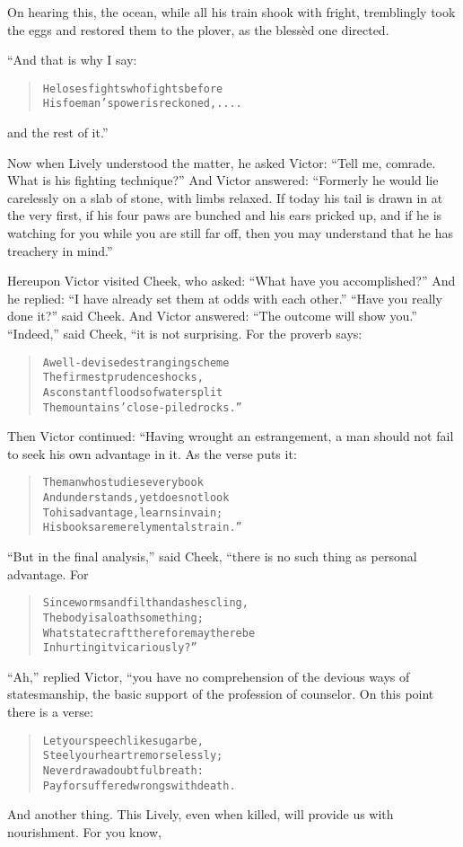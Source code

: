 \documentclass[article, twoside, 10pt]{memoir}
\renewenvironment{verbatim}{%
\begin{quote}%
\vskip -10pt%
\begin{alltt}\normalfont\small}{\end{alltt}%
\end{quote}%
\vskip -10pt
} %
\begin{document}
On hearing this, the ocean, while all his train shook with fright,
tremblingly took the eggs and restored them to the plover, as the
blessèd one directed.

“And that is why I say:

\begin{verbatim}
He loses fights who fights before
    His foeman's power is reckoned, ....
\end{verbatim}
and the rest of it.”

Now when Lively understood the matter, he asked Victor:
``Tell me, comrade. What is his fighting technique?'' And Victor
answered:
``Formerly he would lie carelessly on a slab of stone, with limbs relaxed. If today his tail is drawn in at the very first, if his four paws are bunched and his ears pricked up, and if he is watching for you while you are still far off, then you may understand that he has treachery in mind.''

Hereupon Victor visited Cheek, who asked:
``What have you accomplished?'' And he replied:
``I have already set them at odds with each other.''
``Have you really done it?'' said Cheek. And Victor answered:
``The outcome will show you.'' ``Indeed,'' said Cheek, “it is not
surprising. For the proverb says:

\begin{verbatim}
A well-devised estranging scheme
    The firmest prudence shocks,
As constant floods of water split
    The mountains' close-piled rocks.”
\end{verbatim}
Then Victor continued: “Having wrought an estrangement, a man
should not fail to seek his own advantage in it. As the verse puts
it:

\begin{verbatim}
The man who studies every book
And understands, yet does not look
To his advantage, learns in vain;
His books are merely mental strain.”
\end{verbatim}
``But in the final analysis,'' said Cheek, “there is no such thing
as personal advantage. For

\begin{verbatim}
Since worms and filth and ashes cling,
The body is a loathsome thing;
What statecraft therefore may there be
In hurting it vicariously?”
\end{verbatim}
``Ah,'' replied Victor, “you have no comprehension of the devious
ways of statesmanship, the basic support of the profession of
counselor. On this point there is a verse:

\begin{verbatim}
Let your speech like sugar be,
Steel your heart remorselessly;
Never draw a doubtful breath:
Pay for suffered wrongs with death.
\end{verbatim}
And another thing. This Lively, even when killed, will provide us
with nourishment. For you know,
\end{document}
